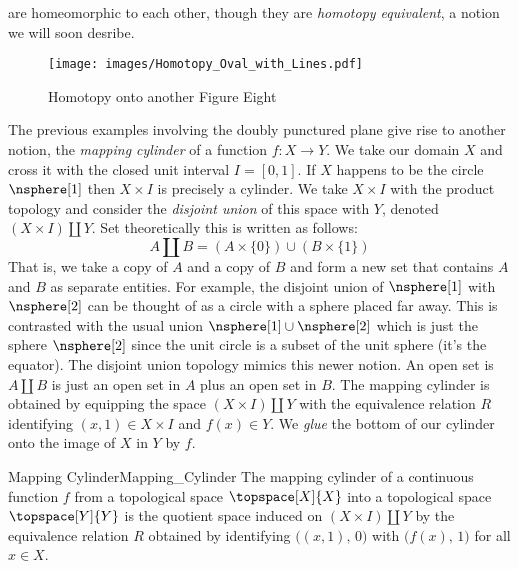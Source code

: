 \documentclass{book}                                                           %
\begin{document}
                are homeomorphic to each other, though they are
                \textit{homotopy equivalent}, a notion we will soon desribe.
                \begin{figure}[H]
                    \centering
                    \captionsetup{type=figure}
                    \texttt{[image: images/Homotopy\_Oval\_with\_Lines.pdf]}
                    \caption{Homotopy onto another Figure Eight}
                    \label{fig:Homotopy_Oval_with_Line}
                \end{figure}
                The previous examples involving the doubly punctured plane give
                rise to another notion, the \textit{mapping cylinder} of a
                function $f:X\rightarrow{Y}$. We take our domain $X$ and cross
                it with the closed unit interval $I=[0,1]$. If $X$ happens to be
                the circle $\nsphere[1]$ then $X\times{I}$ is precisely a
                cylinder. We take $X\times{I}$ with the product topology and
                consider the \textit{disjoint union} of this space with $Y$,
                denoted $(X\times{I})\coprod{Y}$. Set theoretically this is
                written as follows:
                \begin{equation}
                    \label{eqn:Def_Disjoint_Union}%
                    A\coprod{B}=(A\times\{0\})\cup(B\times\{1\})
                \end{equation}
                That is, we take a copy of $A$ and a copy of $B$ and form a
                new set that contains $A$ and $B$ as separate entities. For
                example, the disjoint union of $\nsphere[1]$ with $\nsphere[2]$
                can be thought of as a circle with a sphere placed far away.
                This is contrasted with the usual union
                $\nsphere[1]\cup\nsphere[2]$ which is just the sphere
                $\nsphere[2]$ since the unit circle is a subset of the unit
                sphere (it's the equator). The disjoint union topology mimics
                this newer notion. An open set is $A\coprod{B}$ is just an open
                set in $A$ plus an open set in $B$. The mapping cylinder is
                obtained by equipping the space $(X\times{I})\coprod{Y}$ with
                the equivalence relation $R$ identifying $(x,1)\in{X}\times{I}$
                and $f(x)\in{Y}$. We \textit{glue} the bottom of our cylinder
                onto the image of $X$ in $Y$ by $f$.
                \begin{fdefinition}{Mapping Cylinder}{Mapping_Cylinder}
                    The mapping cylinder of a continuous function $f$ from a
                    topological space $\topspace[X]{X}$ into a topological space
                    $\topspace[Y]{Y}$ is the quotient space induced on
                    $(X\times{I})\coprod{Y}$ by the equivalence relation $R$
                    obtained by identifying $\big((x,1),\,0\big)$ with
                    $\big(f(x),\,1\big)$ for all $x\in{X}$.
                \end{fdefinition}
\end{document}
